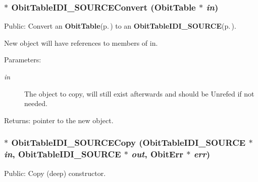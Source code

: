 \subsubsection{$\ast$ Obit\-Table\-IDI\_\-SOURCEConvert ({\bf Obit\-Table} $\ast$ {\em in})}\label{ObitTableIDI__SOURCE_8c_a19}


Public: Convert an {\bf Obit\-Table}{\rm (p.\,\pageref{structObitTable})} to an {\bf Obit\-Table\-IDI\_\-SOURCE}{\rm (p.\,\pageref{structObitTableIDI__SOURCE})}. 

New object will have references to members of in. \begin{Desc}
\item[Parameters:]
\begin{description}
\item[{\em in}]The object to copy, will still exist afterwards and should be Unrefed if not needed. \end{description}
\end{Desc}
\begin{Desc}
\item[Returns:]pointer to the new object. \end{Desc}
\subsubsection{$\ast$ Obit\-Table\-IDI\_\-SOURCECopy ({\bf Obit\-Table\-IDI\_\-SOURCE} $\ast$ {\em in}, {\bf Obit\-Table\-IDI\_\-SOURCE} $\ast$ {\em out}, {\bf Obit\-Err} $\ast$ {\em err})}\label{ObitTableIDI__SOURCE_8c_a20}


Public: Copy (deep) constructor. 


